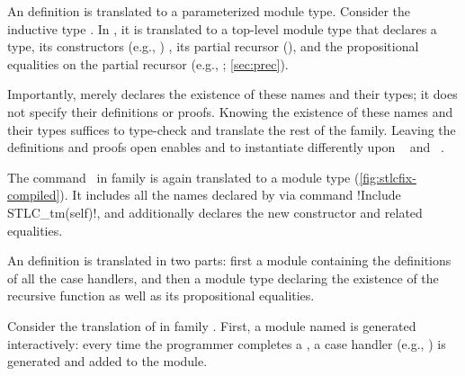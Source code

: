 



An  definition is translated to a parameterized module type.
Consider the inductive type .
In , it is translated to a top-level module type
 that declares a  type,
its constructors (e.g., ) ,
its partial recursor (),
and the propositional equalities on the partial recursor
(e.g., ; \cref{sec:prec}).

Importantly,
 merely declares the existence of these names and their types;
it does not specify their definitions or proofs.
Knowing the existence of these names and their types
suffices to type-check and translate the rest of the family.
Leaving the definitions and proofs open enables  and 
to instantiate  differently upon ~ and ~.

The command \dadada~in family
 is again translated to a module type  (\cref{fig:stlcfix-compiled}).
It includes all the names declared by 
via command \lsti!Include STLC\_tm(self)!,
and additionally declares
the new constructor  and related equalities.



An  definition is translated in two parts:
first a module containing the definitions of all the case handlers,
and then a module type declaring the existence of the recursive function as well as
its propositional equalities.

Consider the translation of  in family .
First, a module named  is generated interactively:
every time the programmer completes a , a case handler (e.g., )
is generated and added to the module.

